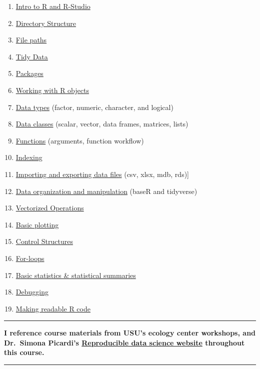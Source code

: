 \documentclass[
]{book}
\providecommand{\tightlist}{%
  \setlength{\itemsep}{0pt}\setlength{\parskip}{0pt}}
\begin{document}
\begin{enumerate}
\def\labelenumi{\arabic{enumi}.}
\tightlist
\item
  \hyperref[intro]{Intro to R and R-Studio}
\item
  \hyperref[directory-structure]{Directory Structure}
\item
  \hyperref[file]{File paths}
\item
  \hyperref[tidy-data]{Tidy Data}
\item
  \hyperref[packages]{Packages}
\item
  \hyperref[r-objects]{Working with R objects}
\item
  \hyperref[data-types]{Data types} (factor, numeric, character, and logical)
\item
  \hyperref[data-classes]{Data classes} (scalar, vector, data frames, matrices, lists)
\item
  \hyperref[functions]{Functions} (arguments, function workflow)
\item
  \hyperref[index]{Indexing}
\item
  \hyperref[import-export]{Importing and exporting data files} (csv, xlsx, mdb, rds){]}
\item
  \hyperref[data-org]{Data organization and manipulation} (baseR and tidyverse)
\item
  \hyperref[vectorized]{Vectorized Operations}
\item
  \hyperref[plotting]{Basic plotting}
\item
  \hyperref[control]{Control Structures}
\item
  \hyperref[for-loops]{For-loops}
\item
  \hyperref[stats]{Basic statistics \& statistical summaries}
\item
  \hyperref[debugging]{Debugging}
\item
  \hyperref[readable-r]{Making readable R code}
\end{enumerate}

\begin{center}\rule{0.5\linewidth}{0.5pt}\end{center}

\textbf{I reference course materials from USU's ecology center workshops, and Dr.~Simona Picardi's \href{https://ecorepsci.github.io/reproducible-science/index.html}{Reproducible data science website} throughout this course.}

\begin{center}\rule{0.5\linewidth}{0.5pt}\end{center}
\end{document}

